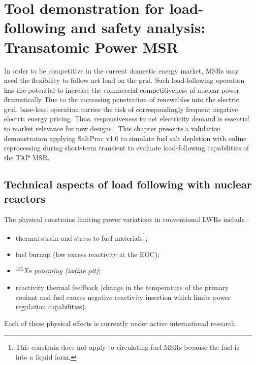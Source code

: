 \chapter{Tool demonstration for load-following and safety analysis: 
Transatomic Power MSR}
In order to be competitive in the current domestic energy market, \glspl{MSR} 
may need the flexibility to follow net load on the grid. Such load-following 
operation has the potential to increase the commercial competitiveness of 
nuclear power dramatically. Due to the increasing penetration of renewables 
into the electric grid, base-load operation carries the risk of 
correspondingly frequent negative electric energy pricing. Thus, 
responsiveness to net electricity demand is essential to market relevance 
for new designs \cite{energy_information_administration_u.s._2016}.
This chapter presents a validation demonstration applying SaltProc v1.0 to 
simulate fuel salt depletion with online reprocessing during short-term 
transient to evaluate load-following capabilities of the \gls{TAP} \gls{MSR}.

\section{Technical aspects of load following with nuclear 
reactors}\label{ch5:aspects}

The physical constrains limiting power variations in conventional \glspl{LWR} 
include \cite{lokhov_technical_2011}:
\begin{itemize}[noitemsep, topsep=0pt]
	\item thermal strain and stress to fuel materials\footnote{This constrain 
		does not apply to circulating-fuel \glspl{MSR} because the fuel is 
		into a
		liquid form.};
	\item fuel burnup (low excess reactivity at the \gls{EOC});
	\item \emph{$^{135}$Xe poisoning (iodine pit)};
	\item reactivity thermal feedback (change in the temperature of the 
	primary coolant and fuel causes negative reactivity insertion which limits 
	power regulation capabilities).
\end{itemize}
Each of these physical effects is currently under active international 
research. 

